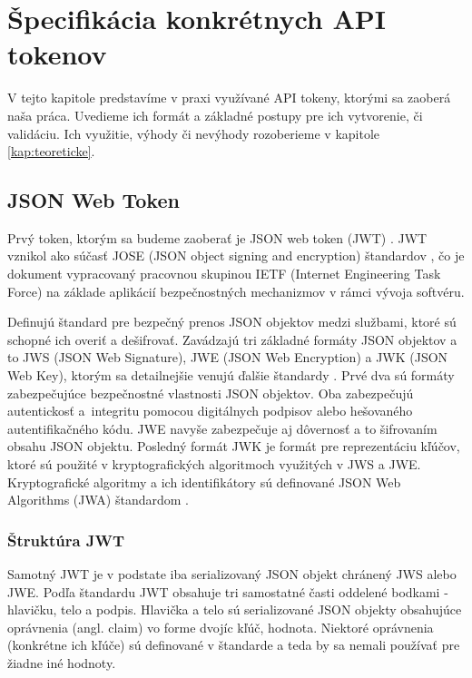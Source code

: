 \chapter{Špecifikácia konkrétnych API tokenov}

\label{kap:typy} %

V tejto kapitole predstavíme v praxi využívané API tokeny, ktorými sa zaoberá naša práca. Uvedieme ich formát a základné postupy pre ich vytvorenie, či validáciu. Ich využitie, výhody či nevýhody rozoberieme v kapitole \ref{kap:teoreticke}.


\section{JSON Web Token}

Prvý token, ktorým sa budeme zaoberať je JSON web token (JWT) \cite{jwt_rfc}. JWT vznikol ako súčasť JOSE (JSON object signing and encryption) štandardov \cite{jose_rfc}, čo je dokument vypracovaný pracovnou skupinou IETF (Internet Engineering Task Force) na základe aplikácií bezpečnostných mechanizmov v rámci vývoja softvéru.

Definujú štandard pre bezpečný prenos JSON objektov medzi službami, ktoré sú schopné ich overiť a dešifrovať. Zavádzajú tri základné formáty JSON objektov a to JWS (JSON Web Signature), JWE (JSON Web Encryption) a JWK (JSON Web Key), ktorým sa detailnejšie venujú ďalšie štandardy \cite{jws_rfc, jwe_rfc, jwk_rfc}. Prvé dva sú formáty zabezpečujúce bezpečnostné vlastnosti JSON objektov. Oba zabezpečujú autentickosť a~integritu pomocou digitálnych podpisov alebo hešovaného autentifikačného kódu. JWE navyše zabezpečuje aj dôvernosť a to šifrovaním obsahu JSON objektu. Posledný formát JWK je formát pre reprezentáciu kľúčov, ktoré sú použité v kryptografických algoritmoch využitých v JWS a JWE. Kryptografické algoritmy a ich identifikátory sú definované JSON Web Algorithms (JWA) štandardom \cite{jwa_rfc}.


\subsection{Štruktúra JWT}

Samotný JWT je v podstate iba serializovaný JSON objekt chránený JWS alebo JWE. Podľa štandardu JWT obsahuje tri samostatné časti oddelené bodkami - hlavičku, telo a podpis. Hlavička a telo sú serializované JSON objekty obsahujúce oprávnenia (angl. claim) vo forme dvojíc kľúč, hodnota. Niektoré oprávnenia (konkrétne ich kľúče) sú definované v štandarde a teda by sa nemali používať pre žiadne iné hodnoty. 

